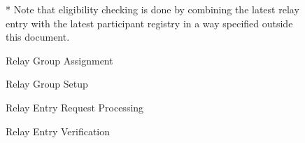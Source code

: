 \documentclass{article}
\begin{document}
\begin{figure}
  
  
  \caption{\label{fig:relay-group-assignment}Relay Group Assignment}

  \vspace{0.5cm}
  * Note that eligibility checking is done by combining the latest relay entry
  with the latest participant registry in a way specified outside this document.
\end{figure}

\begin{figure}
  
  
  \caption{\label{fig:relay-group-setup}Relay Group Setup}
\end{figure}

\begin{figure}
  
   
  \caption{\label{fig:relay-entry-request-processing}Relay Entry Request Processing}
\end{figure}

\begin{figure}
  

  \caption{\label{fig:relay-entry-verification}Relay Entry Verification}
\end{figure}
\end{document}
